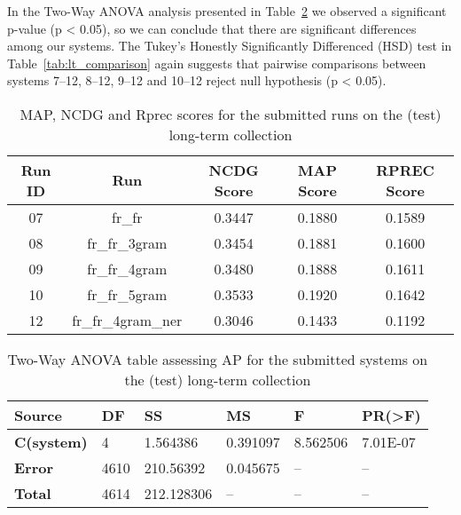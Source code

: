 In the Two-Way ANOVA analysis presented in Table~\ref{tab:lt_anova} we observed a significant p-value (p < 0.05), so we
can conclude that there are significant differences among our systems.
The Tukey's Honestly Significantly Differenced (HSD) test in Table~\ref{tab:lt_comparison} again suggests that pairwise
comparisons between systems 7--12, 8--12, 9--12 and 10--12 reject null hypothesis (p < 0.05).

\begin{table}[h!]
    \begin{center}
        \caption{MAP, NCDG and Rprec scores for the submitted runs on the (test) long-term collection}
        \label{tab:lt_scores}
        \begin{tabular}{|c|c||c|c|c|}
            \hline
            \textbf{Run ID} & \textbf{Run} & \textbf{NCDG Score} & \textbf{MAP Score} & \textbf{RPREC Score}\\
            \hline\hline
            07 & fr\_fr & 0.3447 & 0.1880 & 0.1589 \\
            \hline
            08 & fr\_fr\_3gram & 0.3454 & 0.1881 & 0.1600 \\
            \hline
            09 & fr\_fr\_4gram & 0.3480 & 0.1888 & 0.1611 \\
            \hline
            10 & fr\_fr\_5gram & 0.3533 & 0.1920 & 0.1642 \\
            \hline
            12 & fr\_fr\_4gram\_ner & 0.3046 & 0.1433 & 0.1192\\
            \hline
        \end{tabular}
    \end{center}
\end{table}

\begin{table}[!ht]
    \centering
    \caption{Two-Way ANOVA table assessing AP for the submitted systems on the (test) long-term collection}
    \label{tab:lt_anova}
    \begin{tabular}{|l|l|l|l|l|l|}
    \hline
        \textbf{Source} & \textbf{DF} & \textbf{SS} & \textbf{MS} & \textbf{F} & \textbf{PR(>F)} \\ \hline\hline
        \textbf{C(system)} & 4 & 1.564386 & 0.391097 & 8.562506 & 7.01E-07 \\ \hline
        \textbf{Error} & 4610 & 210.56392 & 0.045675 & -- & -- \\ \hline
        \textbf{Total} & 4614 & 212.128306 & -- & -- & -- \\ \hline
    \end{tabular}
\end{table}

